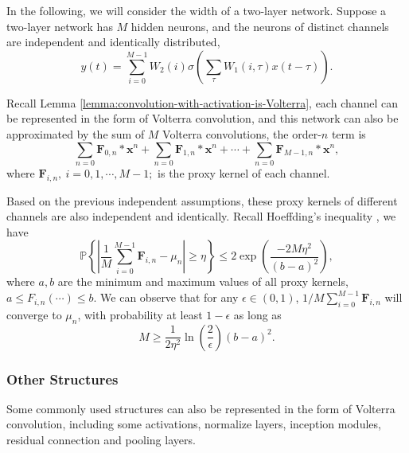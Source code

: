 \documentclass[twoside,11pt]{article}
\def\tvar#1{\mathbf{#1}} %
\begin{document}
In the following, we will consider the width of a two-layer network.
Suppose a two-layer network has \(M\) hidden neurons, and the neurons of distinct channels are independent and identically distributed,
\begin{equation*}
  y(t) = \sum_{i=0}^{M-1} W_2(i) \sigma\left(\sum_{\tau} W_1(i,\tau) x(t-\tau)\right).
\end{equation*}

Recall Lemma \ref{lemma:convolution-with-activation-is-Volterra}, each channel can be represented in the form of Volterra convolution, and this network can also be approximated by the sum of \(M\) Volterra convolutions, the order-\(n\) term is
\begin{equation*}
  \sum_{n=0} \tvar{F}_{0,n} * \tvar{x}^n +
  \sum_{n=0} \tvar{F}_{1,n} * \tvar{x}^n +
  \cdots +
  \sum_{n=0} \tvar{F}_{M-1,n} * \tvar{x}^n,
\end{equation*}
where \(\tvar{F}_{i,n}, ~ i=0, 1, \cdots, M-1;\) is the proxy kernel of each channel.

Based on the previous independent assumptions, these proxy kernels of different channels are also independent and identically.
Recall Hoeffding's inequality \citep{vershynin_2018}, we have
\begin{equation*}
  \mathbb{P}\left\{ \left| \dfrac{1}{M} \sum_{i=0}^{M-1} \tvar{F}_{i,n} - \mu_{n} \right| \ge \eta \right\}
  \le 2 \exp\left(\dfrac{-2 M \eta^2}{(b-a)^2}\right),
\end{equation*}
where \(a,b\) are the minimum and maximum values of all proxy kernels, \(a \le F_{i,n}(\cdots) \le b\).
We can observe that for any \(\epsilon \in (0, 1)\), \(1/M \sum_{i=0}^{M-1} \tvar{F}_{i,n}\) will converge to \(\mu_{n}\), with probability at least \(1 - \epsilon\) as long as
\begin{equation}
  \label{equ:upperbound-of-proxy-kernels}
  M \ge \dfrac{1}{2 \eta^2} \ln\left(\dfrac{2}{\epsilon}\right) (b-a)^2.
\end{equation}

\subsubsection{Other Structures}
\label{subsubsec:extension-on-other-Structures}

Some commonly used structures can also be represented in the form of Volterra convolution, including some activations, normalize layers, inception modules, residual connection and pooling layers.
\end{document}
